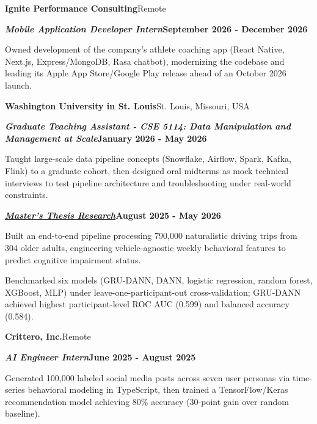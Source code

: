\documentclass[10pt, letterpaper]{article}
\renewenvironment{leadershipentry}[2]{%
    \vspace{\entrySpacing}
    \needspace{4\baselineskip}%
    \noindent\textbf{#1}\hfill #2\par
}{}
\renewenvironment{positionentry}[2]{%
    \vspace{\highlightSpacing}
    \noindent\textbf{\textit{#1}}\hfill \textbf{#2}\par
    \vspace{\highlightSpacing}
    \begin{highlightsforbulletentries}
}{%
    \end{highlightsforbulletentries}
}
\begin{document}
\vspace{\entrySpacing}
\begin{leadershipentry}{Ignite Performance Consulting}{Remote}
	\begin{positionentry}{Mobile Application Developer Intern}{September 2026 - December 2026}
		\item Owned development of the company's athlete coaching app (React Native, Next.js, Express/MongoDB, Rasa chatbot), modernizing the codebase and leading its Apple App Store/Google Play release ahead of an October 2026 launch.
	\end{positionentry}
\end{leadershipentry}

\vspace{\entrySpacing}
\begin{leadershipentry}{Washington University in St. Louis}{St. Louis, Missouri, USA}
	\begin{positionentry}{Graduate Teaching Assistant - CSE 5114: Data Manipulation and Management at Scale}{January 2026 - May 2026}
		\item Taught large-scale data pipeline concepts (Snowflake, Airflow, Spark, Kafka, Flink) to a graduate cohort, then designed oral midterms as mock technical interviews to test pipeline architecture and troubleshooting under real-world constraints.
	\end{positionentry}
	\begin{positionentry}{\href{https://agreddy.com/projects/ms-thesis}{Master's Thesis Research}}{August 2025 - May 2026}
		\item Built an end-to-end pipeline processing 790,000 naturalistic driving trips from 304 older adults, engineering vehicle-agnostic weekly behavioral features to predict cognitive impairment status.
		\item Benchmarked six models (GRU-DANN, DANN, logistic regression, random forest, XGBoost, MLP) under leave-one-participant-out cross-validation; GRU-DANN achieved highest participant-level ROC AUC (0.599) and balanced accuracy (0.584).
	\end{positionentry}
\end{leadershipentry}

\vspace{\entrySpacing}
\begin{leadershipentry}{Crittero, Inc.}{Remote}
	\begin{positionentry}{AI Engineer Intern}{June 2025 - August 2025}
		\item Generated 100,000 labeled social media posts across seven user personas via time-series behavioral modeling in TypeScript, then trained a TensorFlow/Keras recommendation model achieving 80\% accuracy (30-point gain over random baseline).
	\end{positionentry}
\end{leadershipentry}
\end{document}
